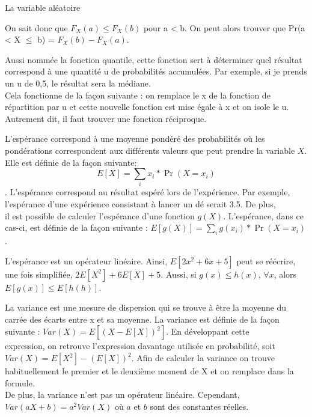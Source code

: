 \documentclass[10pt, french]{article}
\begin{document}
\begin{multicols*}{2}
\begin{probch4}{La variable aléatoire}
\begin{description}
    On sait donc que $F_{X} (a) \le F_{X} (b)$ pour a < b. On peut alors trouver que Pr(a < X $\le$ b) = $F_{X} (b) - F_{X} (a)$.
    \item[Fonction de répartition inverse ($F^{-1}_{X} (u)$):] Aussi nommée la fonction quantile, cette fonction sert à déterminer quel résultat correspond à une quantité u de probabilités accumulées. Par exemple, si je prends un u de 0,5, le résultat sera la médiane. \\
	Cela fonctionne de la façon suivante : on remplace le x de la fonction de répartition par u et cette nouvelle fonction est mise égale à x et on isole le u. Autrement dit, il faut trouver une fonction réciproque. \\
	\item[Espérance :] L'espérance correspond à une moyenne pondéré des probabilités où les pondérations correspondent aux différents valeurs que peut prendre la variable $X$. Elle est définie de la façon suivante: \\
	$$ E[X] = \sum_i x_i * \Pr(X = x_i) $$. L'espérance correspond au résultat espéré lors de l'expérience. Par exemple, l'espérance d'une expérience consistant à lancer un dé serait 3.5. De plus, \\
	il est possible de calculer l'espérance d'une fonction $g(X)$. L'espérance, dans ce cas-ci, est définie de la façon suivante : $E[g(X)] = \sum_i g(x_i) * \Pr(X = x_i) $. \\
	\item[Propriétés de l'espérance: ] L'espérance est un opérateur linéaire. Ainsi, $E[2x^2+6x+5]$ peut se réécrire, une fois simplifiée, $2E[X^2]+6E[X]+5$. Aussi, si $g(x) \le h(x)$, $\forall x$, alors $E[g(x)] \le E[h(h)]$. \\
	\item[Variance :] La variance est une mesure de dispersion qui se trouve à être la moyenne du carrée des écarts entre x et sa moyenne. La variance est définie de la façon suivante : $ Var(X) = E[(X - E[X])^2]$. En développant cette \\ 
	expression, on retrouve l'expression davantage utilisée en probabilité, soit $Var(X) = E[X^2] - (E[X])^2$.  Afin de calculer la variance on trouve habituellement le premier et le deuxième moment de X et on remplace dans la formule. \\
	De plus, la variance n'est pas un opérateur linéaire. Cependant, $Var(aX + b) = a^2 Var(X)$ où $a$ et $b$ sont des constantes réelles.
\end{description}
\end{probch4}
\end{multicols*}
\end{document}
